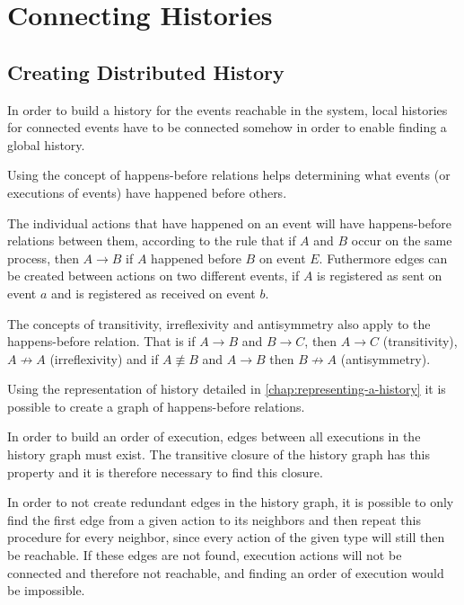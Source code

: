 \chapter{Connecting Histories} %
	\section{Creating Distributed  History} 
	In order to build a history for the events reachable in the system, local histories for connected events have to be connected somehow in order to enable finding a global history. 
	
	Using the concept of happens-before relations helps determining what events (or executions of events) have happened before others. 
	
	The individual actions that have happened on an event will have happens-before relations between them, according to the rule that if $A$ and $B$ occur on the same process, then $A \rightarrow B$ if $A$ happened before $B$ on event $E$. 
	Futhermore edges can be created between actions on two different events, if $A$ is registered as sent on event $a$ and is registered as received on event $b$.
	
	The concepts of transitivity, irreflexivity and antisymmetry also apply to the happens-before relation. That is if $A \rightarrow B$ and $B \rightarrow C$, then $A \rightarrow C$ (transitivity), $A \not\rightarrow A$ (irreflexivity) and if $A \not\equiv B$ and $A \rightarrow B$ then $B \not\rightarrow A$ (antisymmetry).
	
	Using the representation of history detailed in \ref{chap:representing-a-history} it is possible to create a graph of happens-before relations.
	
	In order to build an order of execution, edges between all executions in the history graph must exist. The transitive closure of the history graph has this property and it is therefore necessary to find this closure. 
	
	In order to not create redundant edges in the history graph, it is possible to only find the first edge from a given action to its neighbors and then repeat this procedure for every neighbor, since every action of the given type will still then be reachable. %
	If these edges are not found, execution actions will not be connected and therefore not reachable, and finding an order of execution would be impossible. %
	
